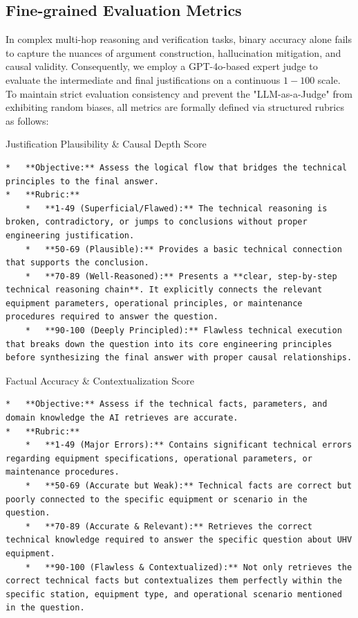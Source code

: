 \documentclass{article}
\begin{document}
\subsection{Fine-grained Evaluation Metrics}
In complex multi-hop reasoning and verification tasks, binary accuracy alone fails to capture the nuances of argument construction, hallucination mitigation, and causal validity. Consequently, we employ a GPT-4o-based expert judge to evaluate the intermediate and final justifications on a continuous $1-100$ scale. To maintain strict evaluation consistency and prevent the "LLM-as-a-Judge" from exhibiting random biases, all metrics are formally defined via structured rubrics as follows:

\begin{promptbox}[colback=ForestGreen!5,colframe=ForestGreen!35!gray,colbacktitle=ForestGreen!55]{Justification Plausibility \& Causal Depth Score}
\begin{lstlisting}
*   **Objective:** Assess the logical flow that bridges the technical principles to the final answer.
*   **Rubric:**
    *   **1-49 (Superficial/Flawed):** The technical reasoning is broken, contradictory, or jumps to conclusions without proper engineering justification.
    *   **50-69 (Plausible):** Provides a basic technical connection that supports the conclusion.
    *   **70-89 (Well-Reasoned):** Presents a **clear, step-by-step technical reasoning chain**. It explicitly connects the relevant equipment parameters, operational principles, or maintenance procedures required to answer the question.
    *   **90-100 (Deeply Principled):** Flawless technical execution that breaks down the question into its core engineering principles before synthesizing the final answer with proper causal relationships.
\end{lstlisting}
\end{promptbox}

\begin{promptbox}[colback=RoyalBlue!5,colframe=RoyalBlue!35!gray,colbacktitle=RoyalBlue!55]{Factual Accuracy \& Contextualization Score}
\begin{lstlisting}
*   **Objective:** Assess if the technical facts, parameters, and domain knowledge the AI retrieves are accurate.
*   **Rubric:**
    *   **1-49 (Major Errors):** Contains significant technical errors regarding equipment specifications, operational parameters, or maintenance procedures.
    *   **50-69 (Accurate but Weak):** Technical facts are correct but poorly connected to the specific equipment or scenario in the question.
    *   **70-89 (Accurate & Relevant):** Retrieves the correct technical knowledge required to answer the specific question about UHV equipment.
    *   **90-100 (Flawless & Contextualized):** Not only retrieves the correct technical facts but contextualizes them perfectly within the specific station, equipment type, and operational scenario mentioned in the question.
\end{lstlisting}
\end{promptbox}
\end{document}

